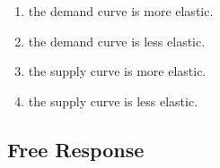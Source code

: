 \documentclass{article}
\begin{document}
\begin{enumerate}
	\begin{enumerate}
	
	\item the demand curve is more elastic.
	
	\item the demand curve is less elastic.
	
	\item the supply curve is more elastic.
	
	\item the supply curve is less elastic.
	
	\end{enumerate}

\end{enumerate}

\subsection*{Free Response}
\end{document}
